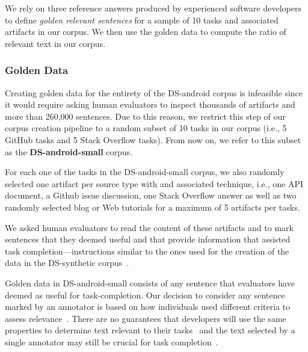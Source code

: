 We rely on three reference answers produced by 
experienced software developers to define \textit{golden relevant sentences} 
for a sample of 10 tasks and associated artifacts in our corpus. 
We then use the golden data to compute the ratio of relevant text in our corpus.




\subsubsection{Golden Data}


Creating golden data for the entirety of the \acs{DS-android} corpus is infeasible
since it would require asking human evaluators to inspect thousands of artifacts and more than 260,000 sentences.
Due to this reason, we restrict this step of our corpus creation pipeline to a random subset of 10 tasks in our corpus (i.e., 5 GitHub tasks and 5 Stack Overflow tasks). 
From now on, we refer to this subset as the \textbf{\acs{DS-android-small}} corpus.


For each one of the tasks in the \acs{DS-android-small} corpus, we also randomly selected 
one artifact per source type with and associated technique, i.e., one API document, a Github issue discussion, one Stack Overflow answer as well as two randomly selected blog or Web tutorials for a maximum of 5 artifacts per tasks.



We asked human evaluators to read the content of these artifacts and 
to mark sentences that they deemed useful and that provide information that assisted task completion---instructions similar to the ones used for the creation of the 
data in the \acs{DS-synthetic} corpus~\cite{marques2020}.



Golden data in \acs{DS-android-small} consists of any sentence that evaluators have deemed as useful for task-completion. 
Our decision to consider any sentence marked by an annotator is based on 
how individuals used different criteria to
assess relevance~\cite{Barry1994, Barry1998, Freund2015}.
There are no guarantees that
developers will use the same properties to determine text relevant to their tasks~\cite{Freund2013, Freund2015} and the text selected by a single annotator may still be crucial for task completion~\cite{marques2020}.


